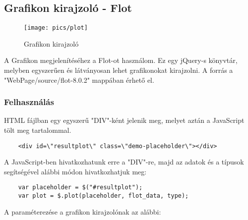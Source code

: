 \subsection{Grafikon kirajzoló - Flot}

	\begin{figure}[h]
	\texttt{[image: pics/plot]}
	\centering
	\caption{Grafikon kirajzoló\label{fig:plot}}
	\end{figure}
	
	A Grafikon megjelenítéséhez a Flot-ot használom. Ez egy jQuery-s könyvtár, melyben egyszerűen és látványosan lehet grafikonokat kirajzolni. A forrás a "WebPage/source/flot-8.0.2" mappában érhető el.
	\subsubsection{Felhasználás}
	HTML fájlban egy egyszerű "DIV"-ként jelenik meg, melyet aztán a JavaScript tölt meg tartalommal.
	\begin{verbatim}
	<div id=\"resultplot\" class=\"demo-placeholder\"></div>
	\end{verbatim}
	A JavaScript-ben hivatkozhatunk erre a "DIV"-re, majd az adatok és a típusok segítségével alábbi módon hivatkozhatjuk meg: 
	\begin{verbatim}
	var placeholder = $("#resultplot");
	var plot = $.plot(placeholder, flot_data, type);
	\end{verbatim}
	A paraméterezése a grafikon kirajzolónak az alábbi: 
